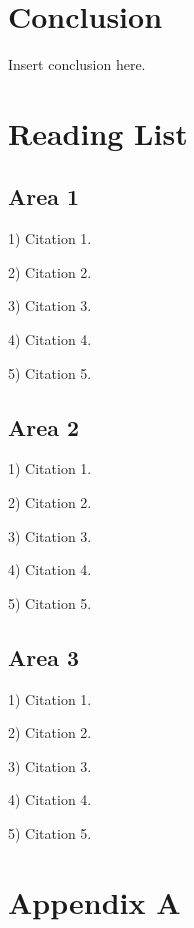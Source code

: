 \documentclass{article}
\begin{document}
\section{Conclusion}

Insert conclusion here.

\newpage

\appendix
\section{Reading List}
\label{app:readinglist}

\subsection{Area 1}

1) Citation 1.

2) Citation 2.

3) Citation 3.

4) Citation 4.

5) Citation 5.


\subsection{Area 2}

1) Citation 1.

2) Citation 2.

3) Citation 3.

4) Citation 4.

5) Citation 5.


\subsection{Area 3}

1) Citation 1.

2) Citation 2.

3) Citation 3.

4) Citation 4.

5) Citation 5.



\newpage

\section{Appendix A}
\label{app:cvtdp2r}


\newpage

\nocite{*}
\printbibliography

% 
%
\end{document}
